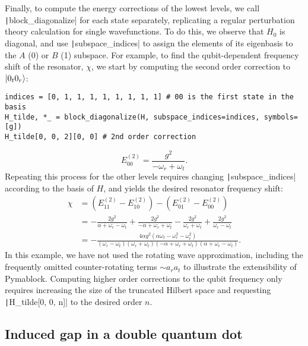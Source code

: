 Finally, to compute the energy corrections of the lowest levels, we call \texttt|block_diagonalize| for each state separately, replicating a regular perturbation theory calculation for single wavefunctions.
To do this, we observe that $H_0$ is diagonal, and use \texttt|subspace_indices| to assign the elements of its eigenbasis to the $A$ (0) or $B$ (1) subspace.
For example, to find the qubit-dependent frequency shift of the resonator, $\chi$, we start by computing the second order correction to $\ket{0_{t}0_{r}}$:
%
\begin{verbatim}
indices = [0, 1, 1, 1, 1, 1, 1, 1, 1] # 00 is the first state in the basis
H_tilde, *_ = block_diagonalize(H, subspace_indices=indices, symbols=[g])
H_tilde[0, 0, 2][0, 0] # 2nd order correction
\end{verbatim}
%
\begin{equation}
    E^{(2)}_{00} = \frac{g^{2}}{-\omega_{r} + \omega_{t}}.
\end{equation}
%
Repeating this process for the other levels requires changing \texttt|subspace_indices| according to the basis of $H$, and yields the desired resonator frequency shift:
%
\begin{equation}
\begin{aligned}
    \chi &= (E^{(2)}_{11} - E^{(2)}_{10}) - (E^{(2)}_{01} - E^{(2)}_{00}) \\
    & = - \frac{2g^{2}}{\alpha + \omega_{r} - \omega_{t}} + \frac{2g^{2}}{- \alpha + \omega_{r} + \omega_{t}} - \frac{2g^{2}}{\omega_{r} + \omega_{t}} + \frac{2g^{2}}{\omega_{r} - \omega_{t}} \\
    & = - \frac{4 \alpha g^{2} \left(\alpha \omega_{t} - \omega_{r}^{2} - \omega_{t}^{2}\right)}{\left(\omega_{r} - \omega_{t}\right) \left(\omega_{r} + \omega_{t}\right) \left(- \alpha + \omega_{r} + \omega_{t}\right) \left(\alpha + \omega_{r} - \omega_{t}\right)}.
\end{aligned}
\end{equation}
%
In this example, we have not used the rotating wave approximation, including the frequently omitted counter-rotating terms $\sim a_{r} a_{t}$ to illustrate the extensibility of Pymablock.
Computing higher order corrections to the qubit frequency only requires increasing the size of the truncated Hilbert space and requesting \texttt|H_tilde[0, 0, n]| to the desired order $n$.

\subsection{Induced gap in a double quantum dot}
\label{sec:induced_gap}


